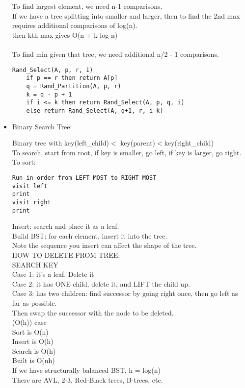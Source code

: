 \begin{itemize}
\begin{theorem}
					To find largest element, we need n-1 comparisons.\\
					If we have a tree splitting into smaller and larger, then to find the 2nd max requires additional comparisons of log(n).\\
					then kth max gives O(n + k log n)\\
					\\
					To find min given that tree, we need additional n/2 - 1 comparisons.\\
					\begin{lstlisting}
Rand_Select(A, p, r, i)
	if p == r then return A[p]
	q = Rand_Partition(A, p, r)
	k = q - p + 1
	if i <= k then return Rand_Select(A, p, q, i)
	else return Rand_Select(A, q+1, r, i-k)
					\end{lstlisting}
				\end{theorem}
			\item Binary Search Tree:
				\begin{theorem}
					Binary tree with key(left_child)$ <$ key(parent)$ < $key(right_child)\\
					To search, start from root, if key is smaller, go left, if key is larger, go right.\\
					To sort:
					\begin{lstlisting}
Run in order from LEFT MOST to RIGHT MOST
visit left
print
visit right
print
					\end{lstlisting}
					Insert: search and place it as a leaf.\\
					Build BST:
					for each element, insert it into the tree.\\
					Note the sequence you insert can affect the shape of the tree.\\
					HOW TO DELETE FROM TREE:\\
					SEARCH KEY\\
					Case 1: it's a leaf. Delete it\\
					Case 2: it has ONE child, delete it, and LIFT the child up.\\
					Case 3: has two children: find successor by going right once, then go left as far as possible.\\
					Then swap the successor with the node to be deleted.\\ (O(h)) case\\
					Sort is O(n)\\
					Insert is O(h)\\
					Search is O(h)\\
					Built is O(nh)\\
					If we have structurally balanced BST, h = log(n)\\
					There are AVL, 2-3, Red-Black trees, B-trees, etc.\\
				\end{theorem}

\end{itemize}
